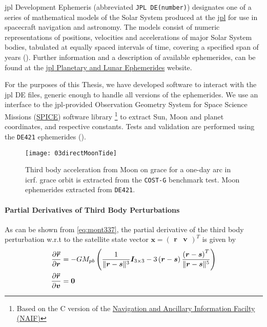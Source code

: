 \gls{jpl} Development Ephemeris (abbreviated \texttt{JPL DE(number)}) 
designates one of a series of mathematical models of the Solar System produced at the 
\href{https://www.jpl.nasa.gov/}{\gls{jpl}} for use in spacecraft navigation and astronomy. 
The models consist of numeric representations of positions, velocities and accelerations 
of major Solar System bodies, tabulated at equally spaced intervals of time, covering 
a specified span of years (\cite{wiki-jplde}). Further information and a description of 
available ephemerides, can be found at the 
\href{https://ssd.jpl.nasa.gov/planets/eph_export.html}{\gls{jpl} Planetary and Lunar Ephemerides} 
website.

For the purposes of this Thesis, we have developed software to interact with the 
\gls{jpl} DE files, generic enough to handle all versions of the ephemerides. 
We use an interface to the \gls{jpl}-provided Observation Geometry System
for Space Science Missions (\href{https://naif.jpl.nasa.gov/naif/}{SPICE}) 
software library \footnote{Based on the C version of the 
\href{https://naif.jpl.nasa.gov/naif/toolkit_C.html}{Navigation and Ancillary Information Facilty (NAIF)}} 
to extract Sun, Moon and planet coordinates, and respective constants. Tests and 
validation are performed using the \texttt{DE421} ephemerides (\cite{Folkner2009}).

\begin{figure}
  \centering
  \texttt{[image: 03directMoonTide]}
  \caption{Third body acceleration from Moon on \gls{grace} for a one-day arc in 
    \gls{icrf}. \gls{grace} orbit is extracted from the \texttt{COST-G} benchmark 
    test. Moon ephemerides extracted from \texttt{DE421}.}
  \label{fig:directMoonTideIcrf}
\end{figure}

\paragraph{Partial Derivatives of Third Body Perturbations}\label{par:third-body-perturbations-partials}

As can be shown from \autoref{eq:mont337}, the partial derivative of the third body 
perturbation w.r.t to the satellite state vector $\bm{x}=\begin{pmatrix}\bm{r} & \bm{v} \end{pmatrix}^T$ is given by
\begin{equation}
  \begin{aligned}
    \frac{\partial \bm{\ddot{r}}}{\partial \bm{r}} &= 
      -GM_{pb} \left( \frac{1}{\lVert\bm{r}-\bm{s}\rVert^3} \bm{I}_{3\times 3} 
      -3 \left(\bm{r}-\bm{s} \right) \frac{\left(\bm{r}-\bm{s} \right)^T}{\lVert\bm{r}-\bm{s}\rVert^5}
      \right) \\
    \frac{\partial \bm{\ddot{r}}}{\partial \bm{v}} &= \bm{0}
  \end{aligned}
\end{equation}

